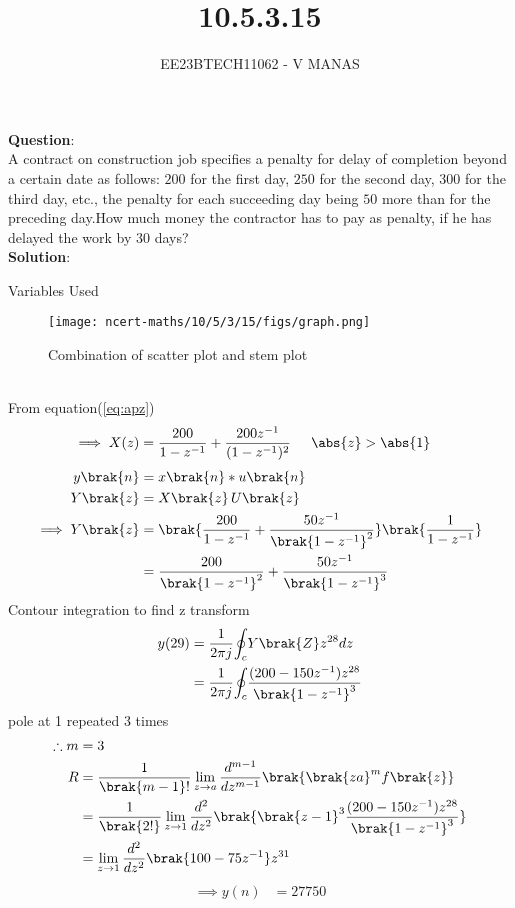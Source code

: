 \documentclass[journal,12pt,twocolumn]{IEEEtran}
\theoremstyle{remark}
\begin{document}

\vspace{3cm}

\title{10.5.3.15}
\author{EE23BTECH11062 - V MANAS}
\maketitle
\newpage

\bigskip

\renewcommand{\thefigure}{\arabic{figure}}
\renewcommand{\thetable}{\arabic{table}}
\textbf{Question}:\\A contract on construction job specifies a penalty for delay of completion beyond a certain date as follows: \rupee $200$ for the first day, \rupee $250$ for the second day, \rupee $300$ for the third day, etc., the penalty for each succeeding day being \rupee $50$ more than for the preceding day.How much money the contractor has to pay as penalty, if he has delayed the work by $30$ days?\\
\textbf{Solution}:
\fi
\begin{table}[h]
    \centering
    
    \caption{Variables Used}
    \label{tab:table_10.5.3.15}
\end{table}
\begin{figure}[h]
    \centering
    \texttt{[image: ncert-maths/10/5/3/15/figs/graph.png]}
    \caption{Combination of scatter plot and stem plot}
    \label{stemplot1}
\end{figure}\\
From equation(\ref{eq:apz})
\begin{align}
\implies X(z)&=\frac{200}{1-z^{-1}}+\frac{200z^{-1}}{(1-z^{-1})^2}\:\:
\quad\abs{z}>\abs{1}
\end{align}
\begin{align}
y\brak{n}&=x\brak{n}*u\brak{n}\\
Y\brak{z}&=X\brak{z}\,U\brak{z}\\
\implies Y\brak{z}&=\brak{\frac{200}{1-z^{-1}}+\frac{50z^{-1}}{\brak{1-
z^{-1}}^2}}\brak{\frac{1}{1-z^{-1}}}\\
&=\frac{200}{\brak{1-z^{-1}}^2}+\frac{50z^{-1}}{\brak{1-z^{-1}}^3}
\end{align}
Contour integration to find z transform
\begin{align}
y(29)&=\frac{1}{2{\pi}j}{\oint_c}Y\brak{Z}z^{28}dz\\
&=\frac{1}{2{\pi}j}{\oint_c}{\frac{(200-150z^{-1})z^{28}}{\brak{1-z^{-1}}^{3}}}
\end{align}
pole at 1 repeated 3 times
\begin{align}
\therefore m&=3\\
R&=\frac{1}{\brak{m-1}!}\lim_{z\to a}\frac{d^{m-1}}{dz^{m-1}}\brak{\brak{z
a}^mf{\brak{z}}}\\
&=\frac{1}{\brak{2!}}\lim_{z\to 1}\frac{d^2}{dz^2}\brak{\brak{z-1}^{3}\frac{(200-150z^{-1})z^{28}}{\brak{1-z^{-1}}^3}}\\
&=\lim_{z\to1}\frac{d^2}{dz^2}\brak{100-75z^{-1}}z^{31}
\end{align}
\begin{align}
\implies y(n)&=27750
\end{align}


\end{document}
